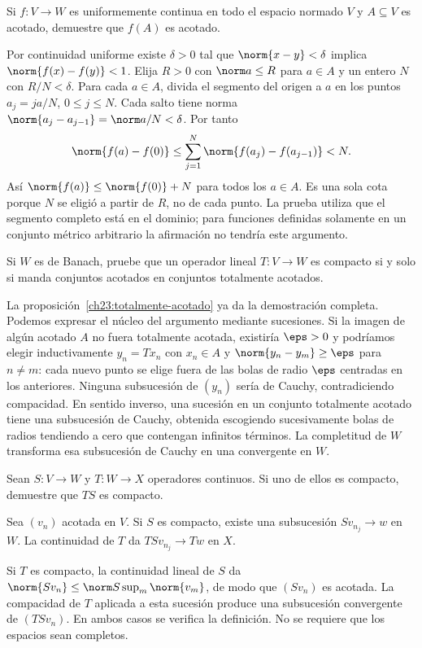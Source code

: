 \begin{ejercicio}\label{ej:lectura-23-1}
Si $f:V\to W$ es uniformemente continua en todo el espacio normado $V$ y $A\subseteq V$ es acotado, demuestre que $f(A)$ es acotado.
\end{ejercicio}
\begin{solucion}
Por continuidad uniforme existe $\delta>0$ tal que $\norm{x-y}<\delta$ implica $\norm{f(x)-f(y)}<1$. Elija $R>0$ con $\norm a\leq R$ para $a\in A$ y un entero $N$ con $R/N<\delta$. Para cada $a\in A$, divida el segmento del origen a $a$ en los puntos $a_j=ja/N$, $0\leq j\leq N$. Cada salto tiene norma $\norm{a_j-a_{j-1}}=\norm a/N<\delta$. Por tanto
\[
 \norm{f(a)-f(0)}\leq\sum_{j=1}^N\norm{f(a_j)-f(a_{j-1})}<N.
\]
Así $\norm{f(a)}\leq\norm{f(0)}+N$ para todos los $a\in A$. Es una sola cota porque $N$ se eligió a partir de $R$, no de cada punto. La prueba utiliza que el segmento completo está en el dominio; para funciones definidas solamente en un conjunto métrico arbitrario la afirmación no tendría este argumento.
\end{solucion}

\begin{ejercicio}\label{ej:lectura-23-2}
Si $W$ es de Banach, pruebe que un operador lineal $T:V\to W$ es compacto si y solo si manda conjuntos acotados en conjuntos totalmente acotados.
\end{ejercicio}
\begin{solucion}
La proposición~\ref{ch23:totalmente-acotado} ya da la demostración completa. Podemos expresar el núcleo del argumento mediante sucesiones. Si la imagen de algún acotado $A$ no fuera totalmente acotada, existiría $\eps>0$ y podríamos elegir inductivamente $y_n=Tx_n$ con $x_n\in A$ y $\norm{y_n-y_m}\geq\eps$ para $n\ne m$: cada nuevo punto se elige fuera de las bolas de radio $\eps$ centradas en los anteriores. Ninguna subsucesión de $(y_n)$ sería de Cauchy, contradiciendo compacidad. En sentido inverso, una sucesión en un conjunto totalmente acotado tiene una subsucesión de Cauchy, obtenida escogiendo sucesivamente bolas de radios tendiendo a cero que contengan infinitos términos. La completitud de $W$ transforma esa subsucesión de Cauchy en una convergente en $W$.
\end{solucion}

\begin{ejercicio}\label{ej:lectura-23-3}
Sean $S:V\to W$ y $T:W\to X$ operadores continuos. Si uno de ellos es compacto, demuestre que $TS$ es compacto.
\end{ejercicio}
\begin{solucion}
Sea $(v_n)$ acotada en $V$. Si $S$ es compacto, existe una subsucesión $Sv_{n_j}\to w$ en $W$. La continuidad de $T$ da $TSv_{n_j}\to Tw$ en $X$.

Si $T$ es compacto, la continuidad lineal de $S$ da $\norm{Sv_n}\leq\norm S\sup_m\norm{v_m}$, de modo que $(Sv_n)$ es acotada. La compacidad de $T$ aplicada a esta sucesión produce una subsucesión convergente de $(TSv_n)$. En ambos casos se verifica la definición. No se requiere que los espacios sean completos.
\end{solucion}

